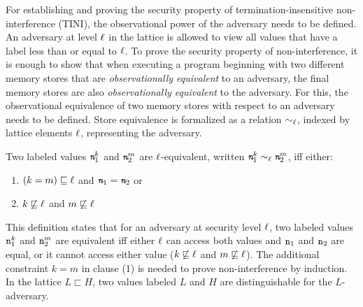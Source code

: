 

For establishing and proving the security
property of termination-insensitive non-interference (TINI), the
observational power of the adversary needs to be defined. 
An adversary at level $\ell$ in the lattice is allowed to view
all values that have a label less than or equal to $\ell$. To prove
the security property of non-interference, it is enough to show that
when executing a program beginning with two different memory stores
that are \emph{observationally equivalent} to an adversary, the final
memory stores are also \emph{observationally equivalent} to the
adversary. For this, the observational equivalence of two memory
stores with respect to an adversary needs to be defined. 
Store equivalence is formalized as a relation $\sim_\ell$,
indexed by lattice elements $\ell$, representing the adversary.

\begin{mydef}
  Two labeled values $\emph{\texttt{n}}_1^k$ and $\emph{\texttt{n}}_2^m$ are $\ell$-equivalent,
  written $\emph{\texttt{n}}_1^k \sim_\ell \emph{\texttt{n}}_2^m$, iff either:
  \begin{enumerate}
  \item $(k = m) \sqsubseteq \ell$ and $\emph{\texttt{n}}_1 = \emph{\texttt{n}}_2$ or
  \item $k \not\sqsubseteq \ell$ and $m \not\sqsubseteq \ell$
  \end{enumerate}
\end{mydef}

This definition states that for an adversary at security level $\ell$,
two labeled values $\texttt{n}_1^k$ and $\texttt{n}_2^m$ are equivalent iff either
$\ell$ can access both values and $\texttt{n}_1$ and $\texttt{n}_2$ are equal, or it
cannot access either value ($k \not\sqsubseteq \ell$ and $m
\not\sqsubseteq \ell$). The additional constraint $k = m$ in clause
(1) is needed to prove non-interference by induction. In the lattice
$L \sqsubset H$, two values labeled $L$ and $H$ are distinguishable
for the $L$-adversary. 

